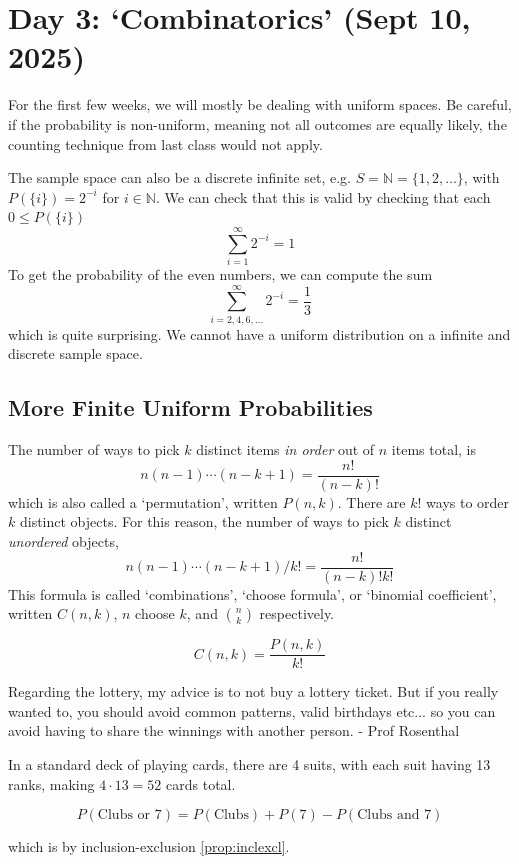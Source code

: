 \section{Day 3: `Combinatorics' (Sept 10, 2025)}

For the first few weeks, we will mostly be dealing with uniform spaces. Be careful, if the probability is non-uniform, meaning not all outcomes are equally likely, the counting technique from last class would not apply.

The sample space can also be a discrete infinite set, e.g. $S = \mathbb{N} = \{ 1, 2, \dots \}$, with $P(\{ i \}) = 2^{-i}$ for $i \in \mathbb{N}$. We can check that this is valid by checking that each $0 \leq P(\{ i \})$
\[
\sum_{i=1}^{\infty} 2^{-i} = 1
\]
To get the probability of the even numbers, we can compute the sum
\[
\sum_{i=2,4,6,\dots}^{\infty} 2^{-i} = \frac{1}{3}
\]
which is quite surprising. We cannot have a uniform distribution on a infinite and discrete sample space.

\subsection{More Finite Uniform Probabilities}

The number of ways to pick $k$ distinct items \textit{in order} out of $n$ items total, is
\[
n(n-1) \cdots (n-k+1) = \frac{n!}{(n-k)!}
\]
which is also called a `permutation', written $P(n, k)$. There are $k!$ ways to order $k$ distinct objects. For this reason, the number of ways to pick $k$ distinct \textit{unordered} objects,
\[
n(n-1) \cdots (n-k+1) / k! = \frac{n!}{(n-k)!k!}
\]
This formula is called `combinations', `choose formula', or `binomial coefficient', written $C(n, k)$, $n$ choose $k$, and $\binom{n}{k}$ respectively. 

\[
C(n, k) = \frac{P(n, k)}{k!}
\]

\begin{remark}
Regarding the lottery, my advice is to not buy a lottery ticket. But if you really wanted to, you should avoid common patterns, valid birthdays etc... so you can avoid having to share the winnings with another person. - Prof Rosenthal
\end{remark}

In a standard deck of playing cards, there are 4 suits, with each suit having 13 ranks, making $4 \cdot 13 = 52$ cards total. 

\[
P(\text{Clubs or $7$}) = P(\text{Clubs}) + P(7) - P(\text{Clubs and $7$})
\]

\noindent which is by inclusion-exclusion \ref{prop:inclexcl}. 
